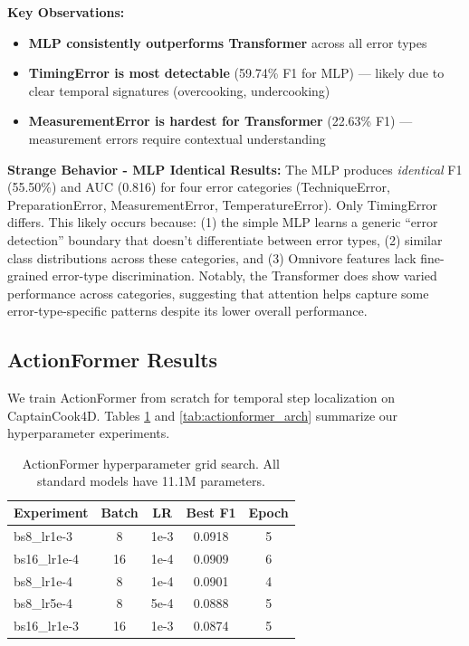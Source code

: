 \documentclass[10pt,twocolumn,letterpaper]{article}
\begin{document}
\textbf{Key Observations:}
\begin{itemize}
    \item \textbf{MLP consistently outperforms Transformer} across all error types
    \item \textbf{TimingError is most detectable} (59.74\% F1 for MLP) --- likely due to clear temporal signatures (overcooking, undercooking)
    \item \textbf{MeasurementError is hardest for Transformer} (22.63\% F1) --- measurement errors require contextual understanding
\end{itemize}

\textbf{Strange Behavior - MLP Identical Results:} The MLP produces \textit{identical} F1 (55.50\%) and AUC (0.816) for four error categories (TechniqueError, PreparationError, MeasurementError, TemperatureError). Only TimingError differs. This likely occurs because: (1) the simple MLP learns a generic ``error detection'' boundary that doesn't differentiate between error types, (2) similar class distributions across these categories, and (3) Omnivore features lack fine-grained error-type discrimination. Notably, the Transformer does show varied performance across categories, suggesting that attention helps capture some error-type-specific patterns despite its lower overall performance.

\subsection{ActionFormer Results}

We train ActionFormer from scratch for temporal step localization on CaptainCook4D. Tables \ref{tab:actionformer_main} and \ref{tab:actionformer_arch} summarize our hyperparameter experiments.

\begin{table}[h]
\centering
\caption{ActionFormer hyperparameter grid search. All standard models have 11.1M parameters.}
\label{tab:actionformer_main}
\begin{tabular}{lcccc}
\toprule
Experiment & Batch & LR & Best F1 & Epoch \\
\midrule
bs8\_lr1e-3 & 8 & 1e-3 & 0.0918 & 5 \\
bs16\_lr1e-4 & 16 & 1e-4 & 0.0909 & 6 \\
bs8\_lr1e-4 & 8 & 1e-4 & 0.0901 & 4 \\
bs8\_lr5e-4 & 8 & 5e-4 & 0.0888 & 5 \\
bs16\_lr1e-3 & 16 & 1e-3 & 0.0874 & 5 \\
\bottomrule
\end{tabular}
\end{table}
\end{document}
